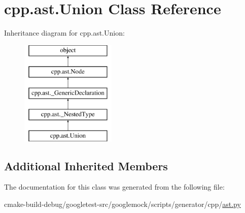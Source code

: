 \hypertarget{classcpp_1_1ast_1_1Union}{}\section{cpp.\+ast.\+Union Class Reference}
\label{classcpp_1_1ast_1_1Union}
Inheritance diagram for cpp.\+ast.\+Union\+:\begin{figure}[H]
\begin{center}
\leavevmode
\includegraphics[height=5.000000cm]{classcpp_1_1ast_1_1Union}
\end{center}
\end{figure}
\subsection*{Additional Inherited Members}


The documentation for this class was generated from the following file\+:\begin{DoxyCompactItemize}
\item 
cmake-\/build-\/debug/googletest-\/src/googlemock/scripts/generator/cpp/\mbox{\hyperlink{ast_8py}{ast.\+py}}\end{DoxyCompactItemize}
